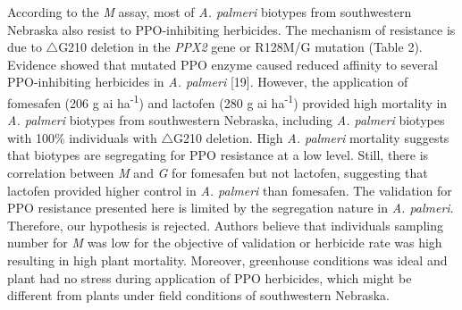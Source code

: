 \documentclass[10pt,letterpaper]{article}
\begin{document}
According to the \emph{M} assay, most of \emph{A. palmeri} biotypes from
southwestern Nebraska also resist to PPO-inhibiting herbicides. The
mechanism of resistance is due to \(\triangle\)G210 deletion in the
\emph{PPX2} gene or R128M/G mutation (Table 2). Evidence showed that
mutated PPO enzyme caused reduced affinity to several PPO-inhibiting
herbicides in \emph{A. palmeri} {[}19{]}. However, the application of
fomesafen (206 g ai ha\textsuperscript{-1}) and lactofen (280 g ai
ha\textsuperscript{-1}) provided high mortality in \emph{A. palmeri}
biotypes from southwestern Nebraska, including \emph{A. palmeri}
biotypes with 100\% individuals with \(\triangle\)G210 deletion. High
\emph{A. palmeri} mortality suggests that biotypes are segregating for
PPO resistance at a low level. Still, there is correlation between
\emph{M} and \emph{G} for fomesafen but not lactofen, suggesting that
lactofen provided higher control in \emph{A. palmeri} than fomesafen.
The validation for PPO resistance presented here is limited by the
segregation nature in \emph{A. palmeri}. Therefore, our hypothesis is
rejected. Authors believe that individuals sampling number for \emph{M}
was low for the objective of validation or herbicide rate was high
resulting in high plant mortality. Moreover, greenhouse conditions was
ideal and plant had no stress during application of PPO herbicides,
which might be different from plants under field conditions of
southwestern Nebraska.
\end{document}
